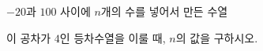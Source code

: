 $-20$과 $100$ 사이에 $n$개의 수를 넣어서 만든 수열 \par\smallskip{}\par\smallskip\noindent 이 공차가 $4$인 등차수열을 이룰 때, $n$의 값을 구하시오.
